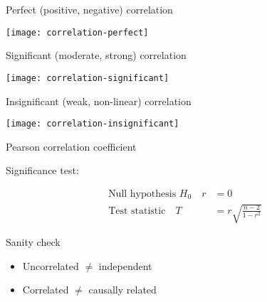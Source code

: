 \documentclass[t]{beamer}
\begin{document}

	\begin{frame}[c]{Perfect (positive, negative) correlation}
			
		\begin{center}
			\texttt{[image: correlation-perfect]}		
		\end{center}

	\end{frame}	

	\begin{frame}[c]{Significant (moderate, strong) correlation}
			
		\begin{center}
			\texttt{[image: correlation-significant]}		
		\end{center}

	\end{frame}	

	\begin{frame}[c]{Insignificant (weak, non-linear) correlation}
			
		\begin{center}
			\texttt{[image: correlation-insignificant]}		
		\end{center}

	\end{frame}
	
	
	\begin{frame}{Pearson correlation coefficient}
	
		\begin{block}{Significance test:}

			\begin{align*}
				\text{Null hypothesis~} H_0 \quad
				r &= 0
				\\
				\text{Test statistic} \quad
				T &= r \sqrt{\frac{n-2}{1-r^2}}
			\end{align*}

		\end{block}
		
		\begin{alertblock}{Sanity check}

			\begin{itemize}
				\item Uncorrelated $\neq$ independent
				\item Correlated $\neq$ causally related
			\end{itemize}
			
		\end{alertblock}
						
	\end{frame}
		
\end{document}
